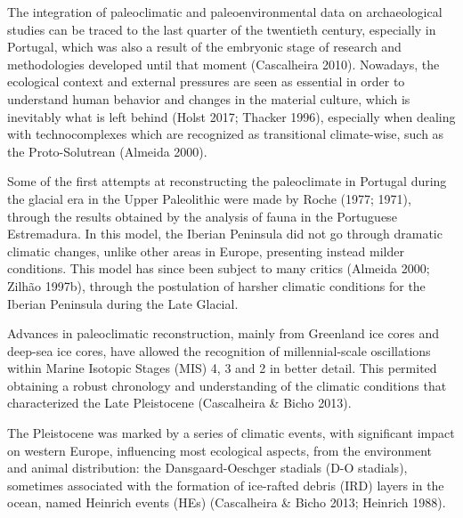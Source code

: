 \documentclass[12pt,twoside]{reedthesis}
\begin{document}
The integration of paleoclimatic and paleoenvironmental data on archaeological studies can be traced to the last quarter of the twentieth century, especially in Portugal, which was also a result of the embryonic stage of research and methodologies developed until that moment (Cascalheira 2010). Nowadays, the ecological context and external pressures are seen as essential in order to understand human behavior and changes in the material culture, which is inevitably what is left behind (Holst 2017; Thacker 1996), especially when dealing with technocomplexes which are recognized as transitional climate-wise, such as the Proto-Solutrean (Almeida 2000).

Some of the first attempts at reconstructing the paleoclimate in Portugal during the glacial era in the Upper Paleolithic were made by Roche (1977; 1971), through the results obtained by the analysis of fauna in the Portuguese Estremadura. In this model, the Iberian Peninsula did not go through dramatic climatic changes, unlike other areas in Europe, presenting instead milder conditions. This model has since been subject to many critics (Almeida 2000; Zilhão 1997b), through the postulation of harsher climatic conditions for the Iberian Peninsula during the Late Glacial.

Advances in paleoclimatic reconstruction, mainly from Greenland ice cores and deep-sea ice cores, have allowed the recognition of millennial-scale oscillations within Marine Isotopic Stages (MIS) 4, 3 and 2 in better detail. This permited obtaining a robust chronology and understanding of the climatic conditions that characterized the Late Pleistocene (Cascalheira \& Bicho 2013).

The Pleistocene was marked by a series of climatic events, with significant impact on western Europe, influencing most ecological aspects, from the environment and animal distribution: the Dansgaard-Oeschger stadials (D-O stadials), sometimes associated with the formation of ice-rafted debris (IRD) layers in the ocean, named Heinrich events (HEs) (Cascalheira \& Bicho 2013; Heinrich 1988).
\end{document}
